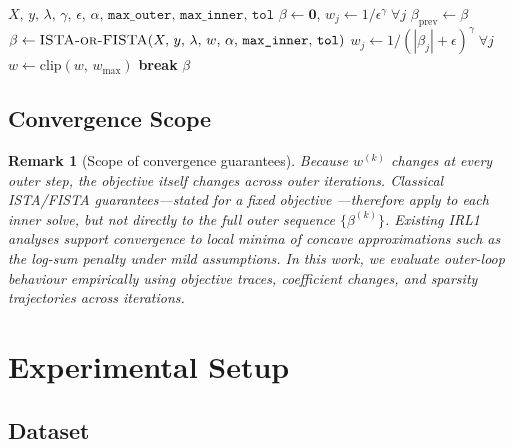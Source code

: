 \documentclass[12pt,a4paper]{article}
\newcommand{\norm}[1]{\left\|#1\right\|}
\newcommand{\abs}[1]{\left|#1\right|}
\newtheorem{remark}{Remark}
\begin{document}
\begin{algorithm}[H]
\caption{IRL1-PG (Iteratively Reweighted $\ell_1$ Proximal Gradient)}
\label{alg:irl1pg}
\begin{algorithmic}[1]
\Require $X,\, y,\, \lambda,\, \gamma,\, \epsilon,\, \alpha,\,
          \texttt{max\_outer},\, \texttt{max\_inner},\, \texttt{tol}$
\State $\beta \leftarrow \mathbf{0}$,\quad
       $w_j \leftarrow 1/\epsilon^\gamma \;\forall j$
    \State $\beta_{\mathrm{prev}} \leftarrow \beta$
    \State $\beta \leftarrow \textsc{ISTA-or-FISTA}(X,\, y,\, \lambda,\, w,\, \alpha,\,
           \texttt{max\_inner},\, \texttt{tol})$
    \State $w_j \leftarrow 1 / (\abs{\beta_j} + \epsilon)^\gamma \;\forall j$
    \State $w \leftarrow \mathrm{clip}(w,\, w_{\max})$
    \If{$\norm{\beta - \beta_{\mathrm{prev}}}_2 / \max(1, \norm{\beta_{\mathrm{prev}}}_2)
        < \texttt{tol\_outer}$}
        \State \textbf{break}
    \EndIf
\EndFor
\State \Return $\beta$
\end{algorithmic}
\end{algorithm}

\subsection{Convergence Scope}

\begin{remark}[Scope of convergence guarantees]
Because $w^{(k)}$ changes at every outer step, the objective itself changes across
outer iterations.  Classical ISTA/FISTA guarantees---stated for a \emph{fixed}
objective \citep{beck2009}---therefore apply to each inner solve, but not directly to
the full outer sequence $\{\beta^{(k)}\}$.  Existing IRL1 analyses
\citep{candes2008,wipf2011} support convergence to local minima of concave
approximations such as the log-sum penalty under mild assumptions.  In this work, we
evaluate outer-loop behaviour empirically using objective traces, coefficient changes,
and sparsity trajectories across iterations.
\end{remark}

\section{Experimental Setup}
\label{sec:experiments}

\subsection{Dataset}
\end{document}
